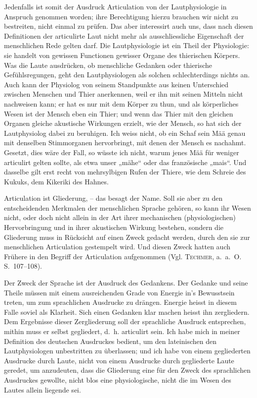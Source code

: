 Jedenfalls ist somit der Ausdruck Articulation von der Lautphysiologie in Anspruch genommen worden; ihre Berechtigung hierzu brauchen wir nicht zu bestreiten, nicht einmal zu prüfen. Das aber interessirt auch uns, dass nach diesen Definitionen der articulirte Laut nicht mehr als ausschliessliche Eigenschaft der menschlichen Rede gelten darf. Die Lautphysiologie ist ein Theil der Physiologie: sie handelt von gewissen Functionen gewisser Organe des thierischen Körpers. Was die Laute ausdrücken, ob menschliche Gedanken oder thierische Gefühlsregungen, geht den Lautphysiologen als solchen schlechterdings nichts an. Auch kann der Physiolog von seinem Standpunkte aus keinen Unterschied zwischen Menschen und Thier anerkennen, weil er ihn mit seinen Mitteln nicht nachweisen kann; er hat es nur mit dem Körper zu thun, und als körperliches Wesen ist der Mensch eben ein Thier; und wenn das Thier mit den gleichen Organen gleiche akustische Wirkungen erzielt, wie der Mensch, so hat sich der Lautphysiolog dabei zu beruhigen. Ich weiss nicht, ob ein Schaf sein Mää genau mit denselben Stimmorganen hervorbringt, mit denen der Mensch es nachahmt. Gesetzt, dies wäre der Fall, so wüsste ich nicht, warum jenes Mää für weniger articulirt gelten sollte, als etwa unser „mähe“ oder das französische „mais“. Und dasselbe gilt erst recht von mehrsylbigen Rufen der Thiere, wie dem Schreie des Kukuks, dem Kikeriki des Hahnes.

Articulation ist Gliederung, – das besagt der Name. Soll sie aber zu den entscheidenden Merkmalen der menschlichen Sprache gehören, so kann ihr Wesen nicht, oder doch nicht allein in der Art ihrer mechanischen (physiologischen) Hervorbringung und in ihrer akustischen Wirkung bestehen, sondern die Gliederung muss in Rücksicht auf einen Zweck gedacht werden, durch den sie zur \label{sp.6} menschlichen Articulation gestempelt wird. Und diesen Zweck hatten auch Frühere in den Begriff der Articulation aufgenommen (Vgl. \textsc{Techmer}, a.~a.~O. S.~107–108).

Der Zweck der Sprache ist der Ausdruck des Gedankens. Der Gedanke und seine Theile müssen mit einem ausreichenden Grade von Energie in’s Bewusstsein treten, um zum sprachlichen Ausdrucke zu drängen. Energie heisst in diesem Falle soviel als Klarheit. Sich einen Gedanken klar machen heisst ihn zergliedern. Dem Ergebnisse dieser Zergliederung soll der sprachliche Ausdruck entsprechen, mithin muss er \label{fp.7} selbst gegliedert, d.~h. articulirt sein. Ich habe mich in meiner Definition des deutschen Ausdruckes bedient, um den lateinischen den Lautphysiologen unbestritten zu überlassen; und ich habe von einem gegliederten Ausdrucke durch Laute, nicht von einem Ausdrucke durch gegliederte Laute geredet, um anzudeuten, dass die Gliederung eine für den Zweck des sprachlichen Ausdruckes gewollte, nicht blos eine physiologische, nicht die im Wesen des Lautes allein liegende sei.

